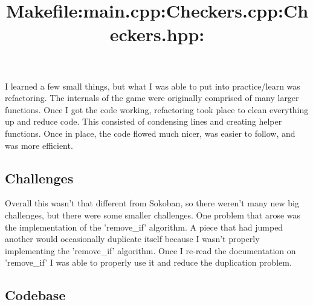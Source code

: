 I learned a few small things, but what I was able to put into practice/learn was refactoring.
The internals of the game were originally comprised of many larger functions.
Once I got the code working, refactoring took place to clean everything up and reduce code.
This consisted of  condensing lines and creating helper functions. 
Once in place, the code flowed much nicer, was easier to follow, and was more efficient.

\subsection{Challenges}\label{sec:ps4:challenges} %

Overall this wasn't that different from Sokoban, so there weren't many new big challenges, but there were some smaller challenges.
One problem that arose was the implementation of the 'remove\_if' algorithm.
A piece that had jumped another would occasionally duplicate itself because I wasn't properly implementing the 'remove\_if' algorithm.
Once I re-read the documentation on 'remove\_if' I was able to properly use it and reduce the duplication problem.

\newpage
\subsection{Codebase}\label{sec:ps4:code} %

\title{\large Makefile:}

\bigskip
\title{\large main.cpp:}

\bigskip
\title{\large Checkers.cpp:}

\bigskip
\title{\large Checkers.hpp:}


\newpage
